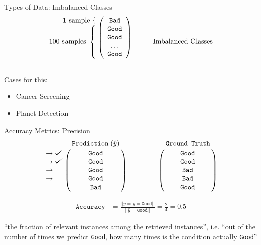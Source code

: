 \documentclass[usenames,dvipsnames]{beamer}
\def\checkmark{\tikz\fill[scale=0.4](0,.35) -- (.25,0) -- (1,.7) -- (.25,.15) -- cycle;}
\begin{document}
\begin{frame}{Types of Data: Imbalanced Classes}
\[
  \begin{array}{@{} c @{}}
    \begin{array}{@{} r @{}}
      \text{1 sample}~\{\hspace{\nulldelimiterspace} \\
      \text{100 samples}~\left\{\begin{array}{@{}c@{}}\null\\\null\\\null\\\null\end{array}\right.
    \end{array}
    \left (
      \begin{array}{ *{1}{c} }
        \texttt{Bad}  \\
        \texttt{Good}  \\
        \texttt{Good}  \\
        \ldots  \\
        \texttt{Good}  \\
      \end{array}
    \right ) \\
    \mathstrut
  \end{array}
  \quad \quad \quad
  \text{Imbalanced Classes}
\]

\pause

Cases for this:
\begin{itemize}%
\item Cancer Screening
\item Planet Detection
\end{itemize}

\end{frame}

\begin{frame}{Accuracy Metrics: Precision}
$$
\bordermatrix{&\texttt{Prediction}\;(\hat{y})\cr
               \rightarrow\checkmark&\texttt{Good}\cr
               \rightarrow\checkmark&\texttt{Good}\cr
                \rightarrow&\texttt{Good}\cr
                \rightarrow&\texttt{Good}\cr
               &\texttt{Bad}}
\qquad \qquad
\bordermatrix{&\texttt{Ground Truth}\cr
                &\texttt{Good}\cr
                &\texttt{Good}\cr
                &\texttt{Bad}\cr
                &\texttt{Bad}\cr
                &\texttt{Good}}
$$

\begin{align*}
\texttt{Accuracy} &= \frac{||y = \hat{y} = \texttt{Good}||}{||\hat{y} = \texttt{Good}||} = \frac{2}{4} = 0.5
\end{align*}

``the fraction of relevant instances among the retrieved instances'', i.e. ``out of the number of times we predict \texttt{Good}, how many times is the condition actually \texttt{Good}''

\end{frame}
\end{document}
